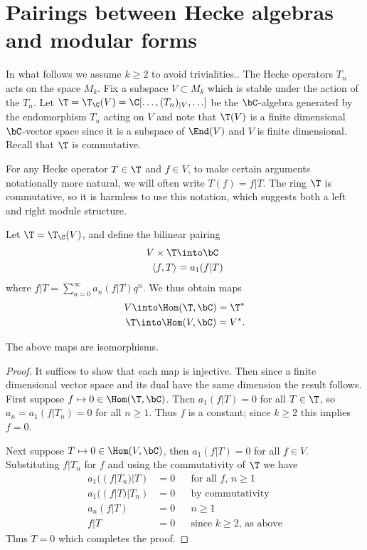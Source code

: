 \documentclass{report}
\begin{document}
\section{Pairings between Hecke algebras and modular forms}\label{sec:pairing1}
In what follows we assume $k\geq 2$ to avoid trivialities..
The Hecke operators $T_n$ acts on the space $M_k$. Fix a
subspace $V\subset M_k$ which is stable under the action
of the $T_n$. Let $\T=\T_{\C}(V)=\C[\ldots, (T_n)_{|V},\ldots]$
be the $\bC$-algebra generated by
the endomorphism $T_n$ acting on $V$ and note that $\T(V)$
is a finite dimensional $\bC$-vector space since it
is a subspace of $\End(V)$ and $V$ is finite dimensional.  Recall
that $\T$ is commutative.

For any Hecke operator $T \in\T$ and $f\in V$, to make certain
arguments notationally more natural, we will often write $T(f) = f|T$.
The ring $\T$ is commutative, so it is harmless to use this notation,
which suggests both a left and right module structure.

Let $\T=\T_\C(V)$, and
define the bilinear pairing
\begin{align*}
V\times \T &\into \bC \\
\langle f,T\rangle & = a_1(f|T)
\end{align*}
where $f|T=\sum_{n=0}^{\infty}a_n(f|T)q^n$.
We thus obtain maps
\begin{align*}
V\into\Hom(\T,\bC)=\T^{*}\\
\T\into \Hom(V,\bC)=V^{*}.
\end{align*}

\begin{theorem}
The above maps are isomorphisms.
\end{theorem}
\begin{proof}
It suffices to show that each map is injective.
Then since a finite dimensional
vector space and its dual have the same dimension the result follows.
First suppose $f\mapsto 0\in\Hom(\T,\bC)$.  Then
$a_1(f|T)=0$ for all $T\in\T$, so
$a_n=a_1(f|T_n)=0$ for all $n\geq 1$. Thus $f$ is a constant;
since $k\geq 2$ this implies $f=0$. %

Next suppose $T\mapsto 0\in \Hom(V,\bC)$, then
$a_1(f|T)=0$ for all $f\in V$. Substituting $f|T_n$ for
$f$ and using the commutativity of $\T$ we have
\begin{align*}
a_1((f|T_n)|T)&=0 && \text{for all $f$, $n\geq 1$}\\
a_1((f|T)|T_n)&=0 && \text{by commutativity}\\
a_n(f|T)&=0 && \text{$n\geq 1$}\\
f|T&=0 && \text{since $k\geq 2$, as above}
\end{align*}
Thus $T=0$ which completes the proof.
\end{proof}
\end{document}
